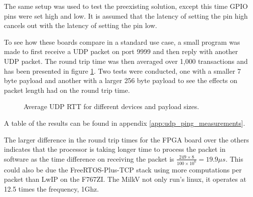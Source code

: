 The same setup was used to test the preexisting solution, except this time GPIO pins were set high and low. It is assumed that the latency of setting the pin high cancels out with the latency of setting the pin low. 




To see how these boards compare in a standard use case, a small program was made to first receive a UDP packet on port 9999 and then reply with another UDP packet. The round trip time was then averaged over 1,000 transactions and has been presented in figure \ref{fig:avg_udp_rtt}. Two tests were conducted, one with a smaller 7 byte payload and another with a larger 256 byte payload to see the effects on packet length had on the round trip time. 

\begin{figure}[ht]
    \centering
    \caption{Average UDP RTT for different devices and payload sizes.}
    \label{fig:avg_udp_rtt}
    \end{figure}
    
A table of the results can be found in appendix \ref{app:udp_ping_measurements}.

The larger difference in the round trip times for the FPGA board over the others indicates that the processor is taking longer time to process the packet in software as the time difference on receiving the packet is $\frac{249 \times 8}{100 \times 10^6}=19.9\mu s$. This could also be due the FreeRTOS-Plus-TCP stack using more computations per packet than LwIP on the F767ZI. The MilkV not only run's linux, it operates at 12.5 times the frequency, 1Ghz. 

